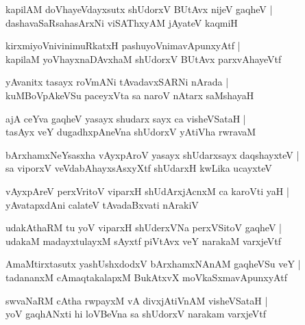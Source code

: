 \documentclass[twoside,12pt,openright]{book}
\newcounter{shloka}[chapter]
\begin{document}
\begin{shloka}%
kapilAM doVhayeVdayxsutx shUdorxV BUtAvx nijeV gaqheV |\\
dashavaSaRsahasArxNi viSAThxyAM jAyateV kaqmiH 
\end{shloka}

\begin{shloka}%
kirxmiyoVnivinimuRkatxH pashuyoVnimavApunxyAtf |\\
kapilaM yoVhayxnaDAvxhaM shUdorxV BUtAvx parxvAhayeVtf 
\end{shloka}

\begin{shloka}%
yAvanitx tasayx roVmANi tAvadavxSARNi nArada |\\
kuMBoVpAkeVSu paceyxVta sa naroV nAtarx saMshayaH
\end{shloka}

\begin{shloka}%
ajA ceYva gaqheV yasayx shudarx sayx ca visheVSataH |\\
tasAyx veY dugadhxpAneVna shUdorxV yAtiVha rwravaM 
\end{shloka}

\begin{shloka}%
bArxhamxNeYsasxha vAyxpAroV yasayx shUdarxsayx daqshayxteV |\\
sa viporxV veVdabAhayxsAsxyXtf shUdarxH kwLika ucayxteV 
\end{shloka}

\begin{shloka}%
vAyxpAreV perxVritoV viparxH shUdArxjAcnxM ca karoVti yaH |\\
yAvatapxdAni calateV tAvadaBxvati nArakiV 
\end{shloka}

\begin{shloka}%
udakAthaRM tu yoV viparxH shUderxVNa perxVSitoV gaqheV |\\
udakaM madayxtulayxM sAyxtf piVtAvx veY narakaM varxjeVtf
\end{shloka}

\begin{shloka}%
AmaMtirxtasutx yashUshxdodxV bArxhamxNAnAM gaqheVSu veY |\\
tadananxM cAmaqtakalapxM BukAtxvX moVkaSxmavApunxyAtf
\end{shloka}

\begin{shloka}%
swvaNaRM cAtha rwpayxM vA divxjAtiVnAM visheVSataH |\\
yoV gaqhANxti hi loVBeVna sa shUdorxV narakam varxjeVtf
\end{shloka}
\end{document}

